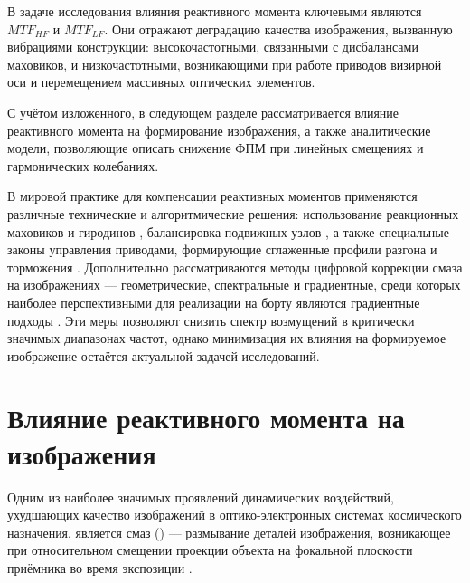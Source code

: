 В задаче исследования влияния реактивного момента ключевыми являются \(MTF_{HF}\) и \(MTF_{LF}\). Они отражают деградацию качества изображения, вызванную вибрациями конструкции: высокочастотными, связанными с дисбалансами маховиков, и низкочастотными, возникающими при работе приводов визирной оси и перемещением массивных оптических элементов.

С учётом изложенного, в следующем разделе рассматривается влияние реактивного момента на формирование  изображения, а также аналитические модели, позволяющие описать снижение ФПМ при линейных смещениях и гармонических колебаниях.

	


В мировой практике для компенсации реактивных моментов применяются различные технические и алгоритмические решения: использование реакционных маховиков и гиродинов \cite{pittelkau2012pointing, dennehy2021spacecraft}, балансировка подвижных узлов \cite{alvarez2018spacecraft}, а также специальные законы управления приводами, формирующие сглаженные профили разгона и торможения \cite{lappas2002attitude, zhao2023effect}. Дополнительно рассматриваются методы цифровой коррекции смаза на изображениях — геометрические, спектральные и градиентные, среди которых наиболее перспективными для реализации на борту являются градиентные подходы \cite{volobuev2021dissertation}. Эти меры позволяют снизить спектр возмущений в критически значимых диапазонах частот, однако минимизация их влияния на формируемое изображение остаётся актуальной задачей исследований.

\section{Влияние реактивного момента на \blur{} изображения}

Одним из наиболее значимых проявлений динамических воздействий, ухудшающих качество изображений в оптико-электронных системах космического назначения, является смаз (\blur{}) — размывание деталей изображения, возникающее при относительном смещении проекции объекта на фокальной плоскости приёмника во время экспозиции \cite{Haghshenas2015, wahballah2018smear}.

